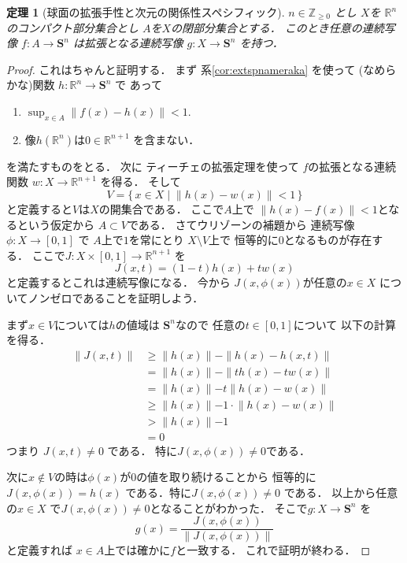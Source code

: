\documentclass[leqno, a4paper, 12pt]{jsarticle}
\newtheorem{thm}{定理}
\newcommand{\zz}{\mathbb{Z}}
\newcommand{\rr}{\mathbb{R}}
\newcommand{\mysphere}[1]{\mathbf{S}^{#1}}
\begin{document}
\begin{thm}[球面の拡張手性と次元の関係性スペシフィック]\label{thm:specifickakutyou}
$n\in \zz_{\ge 0}$
とし
$X$を
$\rr^{n}$
のコンパクト部分集合とし
$A$を$X$の閉部分集合とする．
このとき任意の連続写像
$f\colon A\to \mysphere{n}$
は拡張となる連続写像
$g\colon X\to \mysphere{n}$
を持つ．
\end{thm}
\begin{proof}
これはちゃんと証明する．
まず
系\ref{cor:extspnameraka}
を使って
(なめらかな)関数
$h\colon \rr^{n}\to \mysphere{n}$
で
あって
\begin{enumerate}
\item 
$\sup_{x\in A}\lVert f(x) -h(x) \rVert<1$. 
\item 
像$h(\rr^{n})$は$0\in \rr^{n+1}$
を含まない．
\end{enumerate}
を満たすものをとる．
次に
ティーチェの拡張定理を使って
$f$の拡張となる連続関数
$w\colon X\to \rr^{n+1}$
を得る．
そして
\[
V=\{\, x\in X\mid \lVert h(x)-w(x) \rVert<1\, \}
\]
と定義すると$V$は$X$の開集合である．
ここで$A$上で
$\lVert h(x)-f(x)\rVert <1$となるという仮定から
$A\subset V$である．
さてウリゾーンの補題から
連続写像$\phi\colon X\to [0, 1]$
で
$A$上で$1$を常にとり
$X\setminus V$上で
恒等的に$0$となるものが存在する．
ここで$J\colon X\times [0, 1]\to \rr^{n+1}$
を
\[
J(x, t)=(1-t)h(x)+tw(x)
\]
と定義するとこれは連続写像になる．
今から
$J(x, \phi(x))$が任意の$x\in X$
についてノンゼロであることを証明しよう．

まず$x\in V$については$h$の値域は
$\mysphere{n}$なので
任意の$t\in [0, 1]$について
以下の計算を得る．
\begin{align*}
\lVert J(x, t)\rVert&\ge 
\lVert h(x)\lVert -\lVert h(x)-h(x, t) \rVert\\
&=\lVert h(x)\lVert -\lVert th(x)-tw(x) \rVert\\
&=\lVert h(x)\lVert -t\lVert h(x)-w(x) \rVert\\
&\ge \lVert h(x)\lVert -1\cdot \lVert h(x)-w(x) \rVert\\
&>\lVert h(x)\lVert -1\\
&=0
\end{align*}
つまり
$J(x, t)\neq 0$
である．
特に$J(x, \phi(x))\neq 0$である．

次に$x\not \in V$の時は$\phi(x)$が$0$の値を取り続けることから
恒等的に$J(x, \phi(x))=h(x)$
である．特に$J(x, \phi(x))\neq 0$
である．
以上から任意の$x\in X$
で$J(x, \phi(x))\neq 0$となることがわかった．
そこで$g\colon X\to \mysphere{n}$
を
\[
g(x)=\frac{J(x, \phi(x))}{\lVert J(x, \phi(x))\rVert}
\]
と定義すれば
$x\in A$上では確かに$f$と一致する．
これで証明が終わる．
\end{proof}
\end{document}
